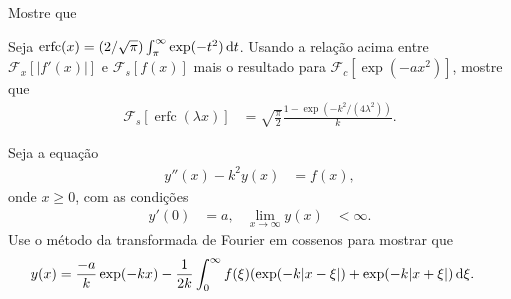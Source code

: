 \documentclass[a4paper,12pt, leqno, answers]{exam}
\DeclareMathOperator{\erfc}{erfc}
\begin{document}
\begin{questions}
    \question Mostre que

    \question Seja $\erfc(x) = \left( 2 / \sqrt{\pi} \right) \int_\pi^\infty
    \exp(-t^2) \id{t}$. Usando a relação acima entre
    $\mathcal{F}_x\left[ |f'(x)| \right]$ e $\mathcal{F}_s\left[ f(x)
    \right]$ mais o resultado para $\mathcal{F}_c\left[ \exp\left( -a x^2
    \right) \right]$, mostre que
    \begin{align*}
        \mathcal{F}_s\left[ \erfc(\lambda x) \right] &= \sqrt{\frac{\pi}{2}}
        \frac{1 - \exp\left( -k^2 / \left( 4 \lambda^2 \right) \right)}{k}.
    \end{align*}
    \begin{solution}
    \end{solution}
    
    \question Seja a equação
    \begin{align*}
        y''(x) - k^2 y(x) &= f(x),
    \end{align*}
    onde $x \geq 0$, com as condições
    \begin{align*}
        y'(0) &= a, & \lim_{x \to \infty} y(x) &< \infty.
    \end{align*}
    Use o método da transformada de Fourier em cossenos para mostrar que
    \begin{align*}
        y(x) &= \frac{-a}{k} \exp(-k x) - \frac{1}{2k} \int_0^\infty f(\xi)
        (\exp(-k |x - \xi|) + \exp(-k | x + \xi|) \, \mathrm{d}\xi.
    \end{align*}
    \begin{solution}
    \end{solution}


\end{questions}
\end{document}
